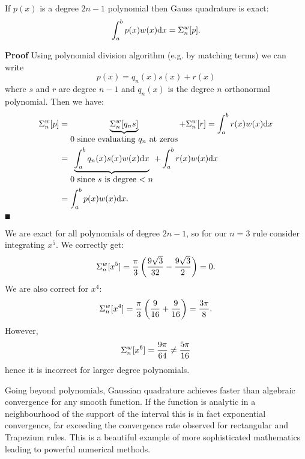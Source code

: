 \begin{theorem} If $p(x)$ is a degree $2n-1$ polynomial then Gauss quadrature is exact:
\[
\ensuremath{\int}_a^b p(x)w(x) {\rm d}x = \ensuremath{\Sigma}_n^w[p].
\]
\end{theorem}
\textbf{Proof} Using polynomial division algorithm (e.g. by matching terms) we can write
\[
p(x) = q_n(x) s(x) + r(x)
\]
where $s$ and $r$ are degree $n-1$ and $q_n(x)$ is the degree $n$ orthonormal polynomial. Then we have:
\begin{align*}
\ensuremath{\Sigma}_n^w[p] &= \underbrace{\ensuremath{\Sigma}_n^w[q_n s]}_{\hbox{$0$ since evaluating $q_n$ at zeros}} + \ensuremath{\Sigma}_n^w[r] = \ensuremath{\int}_a^b r(x) w(x) {\rm d}x\\
&= \underbrace{\ensuremath{\int}_a^b q_n(x)s(x) w(x) {\rm d}x}_{\hbox{$0$ since $s$ is degree $<n$}}  + \ensuremath{\int}_a^b r(x) w(x) {\rm d}x \\
&= \ensuremath{\int}_a^b p(x)w(x) {\rm d}x.
\end{align*}
\ensuremath{\QED}

\begin{example} We are exact for all polynomials of degree $2n-1$, so for our $n = 3$ rule consider integrating $x^5$. We correctly get:
\[
\ensuremath{\Sigma}_n^w[x^5] = {\ensuremath{\pi} \over 3} \left( {9 \sqrt{3} \over 32}  - {9 \sqrt{3} \over 2} \right) = 0.
\]
We are also correct for $x^4$:
\[
\ensuremath{\Sigma}_n^w[x^4] = {\ensuremath{\pi} \over 3} \left( {9 \over 16} + {9 \over 16} \right) = {3 \ensuremath{\pi} \over 8}.
\]
However,
\[
\ensuremath{\Sigma}_n^w[x^6] = {9 \ensuremath{\pi} \over 64} \ensuremath{\neq} {5 \ensuremath{\pi} \over 16}
\]
hence it is incorrect for larger degree polynomials. \end{example}

Going beyond polynomials,  Gaussian quadrature achieves faster than algebraic convergence for any smooth function.  If the function is analytic in a neighbourhood of the support of the interval this is in fact exponential convergence, far exceeding the convergence rate observed for rectangular and Trapezium rules.  This is a beautiful example of more sophisticated mathematics leading to powerful numerical methods.



